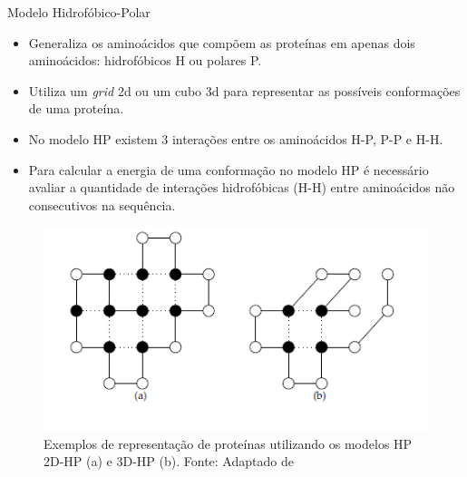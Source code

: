 

\begin{frame}[allowframebreaks]{Modelo Hidrofóbico-Polar}
	

		\begin{itemize}
			\item Generaliza os aminoácidos que compõem as proteínas em apenas dois aminoácidos: hidrofóbicos H ou polares P.
			\item Utiliza um \textit{grid} 2d ou um cubo 3d para representar as possíveis conformações de uma proteína.
			\item No modelo HP existem 3 interações entre os aminoácidos H-P, P-P e H-H.
			\item Para calcular a energia de uma conformação no modelo HP é necessário avaliar a quantidade de interações hidrofóbicas (H-H) entre aminoácidos não consecutivos na sequência.
		\end{itemize}
		
		\begin{figure}[!htb]
			\centering
			\includegraphics[scale=.8]{figuras/modeloHPExemplo.png}
			\caption{Exemplos de representação de proteínas utilizando os modelos HP 2D-HP (a) e 3D-HP (b). Fonte: Adaptado de \cite{santanna2008} }
			\label{fig:exemploModeloHP}
		\end{figure}

\end{frame}



